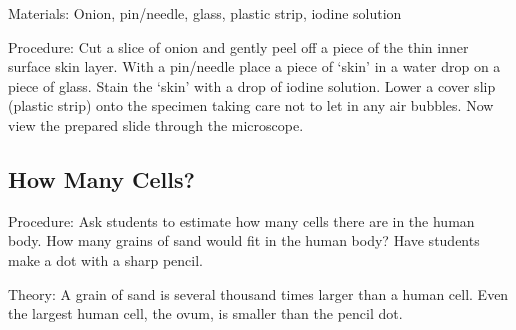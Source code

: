 \begin{multicols}{2}
\begin{description*}
\item[Materials:]{Onion, pin/needle, glass, plastic strip, iodine solution}
\item[Procedure:]{Cut a slice of onion and gently
peel off a piece of the thin inner
surface skin layer. With a
pin/needle place a piece of `skin'
in a water drop on a piece of
glass. Stain the `skin' with a drop
of iodine solution. Lower a cover
slip (plastic strip) onto the specimen taking care
not to let in any air bubbles.
Now view the prepared
slide through the microscope.}
\end{description*}

\subsection{How Many Cells?} %


\begin{description*}
\item[Procedure:]{Ask students to estimate how many cells there are in the human body. How many grains of sand would fit in the human body? Have students make a dot with a sharp pencil.}
\item[Theory:]{A grain of sand is several thousand times larger than a human cell. Even the largest human cell, the ovum, is smaller than the pencil dot.}
\end{description*}


\end{multicols}
